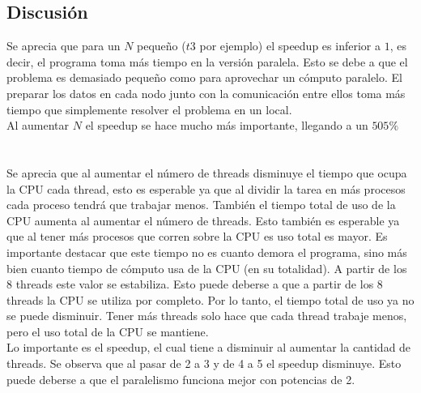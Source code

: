 \documentclass[10pt]{extarticle}
\begin{document}
\subsection*{Discusión}
Se aprecia que para un $N$ pequeño ($t3$ por ejemplo) el speedup es inferior a $1$, es decir, el programa toma más tiempo en la versión paralela. Esto se debe a que el problema es demasiado pequeño como para aprovechar un cómputo paralelo. El preparar los datos en cada nodo junto con la comunicación entre ellos toma más tiempo que simplemente resolver el problema en un local.\\
Al aumentar $N$ el speedup se hace mucho más importante, llegando a un $505\%$\\
\\
\\
Se aprecia que al aumentar el número de threads disminuye el tiempo que ocupa la CPU cada thread, esto es esperable ya que al dividir la tarea en más procesos cada proceso tendrá que trabajar menos. También el tiempo total de uso de la CPU aumenta al aumentar el número de threads. Esto también es esperable ya que al tener más procesos que corren sobre la CPU es uso total es mayor. Es importante destacar que este tiempo no es cuanto demora el programa, sino más bien cuanto tiempo de cómputo usa de la CPU (en su totalidad). A partir de los 8 threads este valor se estabiliza. Esto puede deberse a que a partir de los 8 threads la CPU se utiliza por completo. Por lo tanto, el tiempo total de uso ya no se puede disminuir. Tener más threads solo hace que cada thread trabaje menos, pero el uso total de la CPU se mantiene.\\

Lo importante es el speedup, el cual tiene a disminuir al aumentar la cantidad de threads. Se observa que al pasar de 2 a 3 y de 4 a 5 el speedup disminuye. Esto puede deberse a que el paralelismo funciona mejor con potencias de 2.\\
\end{document}
